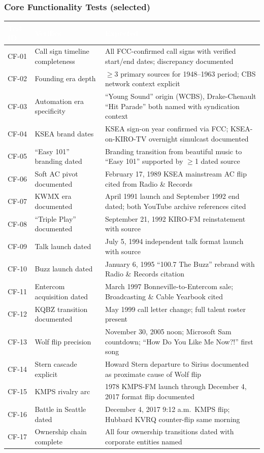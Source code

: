 \documentclass[11pt,letterpaper]{article}
\newcommand{\tableheader}[1]{\textbf{\sffamily\textcolor{white}{#1}}}
\begin{document}
\subsubsection{Core Functionality Tests (selected)}

\begin{center}
\begin{tabularx}{\textwidth}{L{1.5cm}L{3.5cm}X}
\toprule
{}
\tableheader{Test ID} & \tableheader{Verifies} & \tableheader{Expected} \\
\midrule
CF-01 & Call sign timeline completeness & All FCC-confirmed call signs with verified start/end dates; discrepancy documented \\
CF-02 & Founding era depth & $\geq$3 primary sources for 1948--1963 period; CBS network context explicit \\
CF-03 & Automation era specificity & ``Young Sound'' origin (WCBS), Drake-Chenault ``Hit Parade'' both named with syndication context \\
CF-04 & KSEA brand dates & KSEA sign-on year confirmed via FCC; KSEA-on-KIRO-TV overnight simulcast documented \\
CF-05 & ``Easy 101'' branding dated & Branding transition from beautiful music to ``Easy 101'' supported by $\geq$1 dated source \\
CF-06 & Soft AC pivot documented & February 17, 1989 KSEA mainstream AC flip cited from Radio \& Records \\
CF-07 & KWMX era documented & April 1991 launch and September 1992 end dated; both YouTube archive references cited \\
CF-08 & ``Triple Play'' documented & September 21, 1992 KIRO-FM reinstatement with source \\
CF-09 & Talk launch dated & July 5, 1994 independent talk format launch with source \\
CF-10 & Buzz launch dated & January 6, 1995 ``100.7 The Buzz'' rebrand with Radio \& Records citation \\
CF-11 & Entercom acquisition dated & March 1997 Bonneville-to-Entercom sale; Broadcasting \& Cable Yearbook cited \\
CF-12 & KQBZ transition documented & May 1999 call letter change; full talent roster present \\
CF-13 & Wolf flip precision & November 30, 2005 noon; Microsoft Sam countdown; ``How Do You Like Me Now?!'' first song \\
CF-14 & Stern cascade explicit & Howard Stern departure to Sirius documented as proximate cause of Wolf flip \\
CF-15 & KMPS rivalry arc & 1978 KMPS-FM launch through December 4, 2017 format flip documented \\
CF-16 & Battle in Seattle dated & December 4, 2017 9:12 a.m.\ KMPS flip; Hubbard KVRQ counter-flip same morning \\
CF-17 & Ownership chain complete & All four ownership transitions dated with corporate entities named \\
\bottomrule
\end{tabularx}
\end{center}
\end{document}
